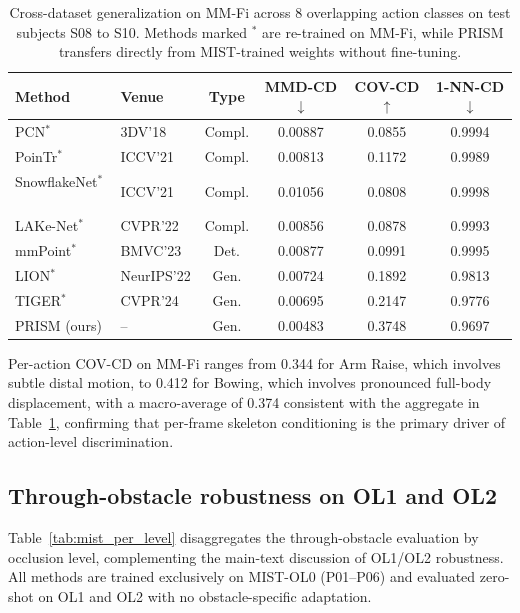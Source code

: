 \documentclass{article}
\begin{document}
\begin{table}[h]
  \centering
  \caption{Cross-dataset generalization on MM-Fi across 8 overlapping action classes on test subjects S08 to S10. Methods marked $^*$ are re-trained on MM-Fi, while PRISM transfers directly from MIST-trained weights without fine-tuning.}
  \label{tab:mmfi_appendix}
  \small
  \setlength{\tabcolsep}{5pt}
  \begin{tabular}{llcccc}
    \toprule
    Method & Venue & Type
           & MMD-CD$\downarrow$ & COV-CD$\uparrow$ & 1-NN-CD$\downarrow$ \\
    \midrule
    PCN$^*$~\cite{yuan2018pcn}               & 3DV'18     & Compl. & 0.00887 & 0.0855 & 0.9994 \\
    PoinTr$^*$~\cite{yu2021pointr}         & ICCV'21    & Compl. & 0.00813 & 0.1172 & 0.9989 \\
    SnowflakeNet$^*$~\cite{xiang2021snowflakenet}& ICCV'21    & Compl. & 0.01056 & 0.0808 & 0.9998 \\
    LAKe-Net$^*$~\cite{tang2022lake}      & CVPR'22    & Compl. & 0.00856 & 0.0878 & 0.9993 \\
    mmPoint$^*$~\cite{xie2023mmpoint}       & BMVC'23    & Det.   & 0.00877 & 0.0991 & 0.9995 \\
    LION$^*$~\cite{vahdat2022lion}             & NeurIPS'22 & Gen.   & 0.00724 & 0.1892 & 0.9813 \\
    TIGER$^*$~\cite{ren2024tiger}           & CVPR'24    & Gen.   & 0.00695 & 0.2147 & 0.9776 \\
    \midrule
    PRISM (ours)                     & --         & Gen.   & 0.00483 & 0.3748 & 0.9697 \\
    \bottomrule
  \end{tabular}
\end{table}

Per-action COV-CD on MM-Fi ranges from 0.344 for Arm Raise, which involves subtle
distal motion, to 0.412 for Bowing, which involves pronounced full-body displacement,
with a macro-average of 0.374 consistent with the aggregate in Table~\ref{tab:mmfi_appendix},
confirming that per-frame skeleton conditioning is the primary driver of action-level
discrimination.

\subsection{Through-obstacle robustness on OL1 and OL2}
\label{app:mist_eval}

Table~\ref{tab:mist_per_level} disaggregates the through-obstacle evaluation
by occlusion level, complementing the main-text discussion of OL1/OL2 robustness.
All methods are trained exclusively on MIST-OL0 (P01--P06) and evaluated
zero-shot on OL1 and OL2 with no obstacle-specific adaptation.
\end{document}
